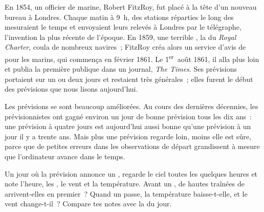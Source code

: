 \begin{history}
En 1854, un officier de marine, Robert FitzRoy, fut placé à la tête d'un
nouveau bureau  à Londres. Chaque matin à 9~h, des stations
réparties le long des  mesuraient le temps et envoyaient leurs
relevés à Londres par le télégraphe, l'invention la plus récente de
l'époque. En 1859, une terrible , la  du
\emph{Royal Charter}, coula de nombreux navires~; FitzRoy créa alors un
service d'avis de  pour les marins, qui commença en février 1861.
Le 1\textsuperscript{er}~août 1861, il alla plus loin et publia la
première  publique dans un journal,
\emph{The Times}. Ses prévisions portaient sur un ou deux jours et
restaient très générales~; elles furent le début des prévisions que nous
lisons aujourd'hui.
\end{history}

Les prévisions se sont beaucoup améliorées. Au cours des dernières
décennies, les prévisionnistes ont gagné environ un jour de bonne
prévision tous les dix ans~: une prévision à quatre jours est aujourd'hui
aussi bonne qu'une prévision à un jour il y a trente ans. Mais plus une
prévision regarde loin, moins elle est sûre, parce que de petites erreurs
dans les observations de départ grandissent à mesure que l'ordinateur
avance dans le temps.

\begin{inthefield}
Un jour où la prévision annonce un , regarde le ciel toutes les
quelques heures et note l'heure, les , le vent et la température.
Avant un , de hautes traînées de  arrivent-elles en
premier~? Quand un  passe, la température baisse-t-elle, et le
vent change-t-il~? Compare tes notes avec la   du jour.
\end{inthefield}

